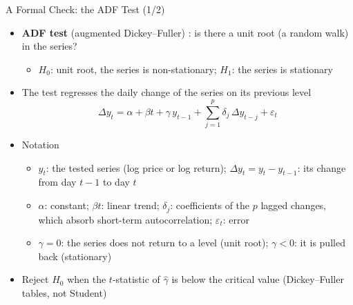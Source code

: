 \begin{frame}{A Formal Check: the ADF Test (1/2)}
\itemsize{\small}
\begin{itemize}
    \item \textbf{ADF test} (augmented Dickey--Fuller) : is there a unit root (a random walk) in the series?
    \begin{itemize}
        \item $H_0$: unit root, the series is non-stationary; $H_1$: the series is stationary
    \end{itemize}
    \item The test regresses the daily change of the series on its previous level \[ \Delta y_t = \alpha + \beta t + \gamma\, y_{t-1} + \sum_{j=1}^{p} \delta_j\, \Delta y_{t-j} + \varepsilon_t \]
    \item Notation
    \begin{itemize}
        \item $y_t$: the tested series (log price or log return); $\Delta y_t = y_t - y_{t-1}$: its change from day $t-1$ to day $t$
        \item $\alpha$: constant; $\beta t$: linear trend; $\delta_j$: coefficients of the $p$ lagged changes, which absorb short-term autocorrelation; $\varepsilon_t$: error
        \item $\gamma = 0$: the series does not return to a level (unit root); $\gamma < 0$: it is pulled back (stationary)
    \end{itemize}
    \item Reject $H_0$ when the $t$-statistic of $\hat\gamma$ is below the critical value (Dickey--Fuller tables, not Student)
\end{itemize}
\end{frame}

